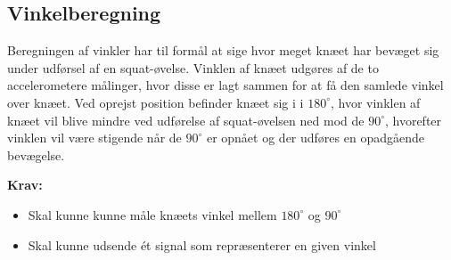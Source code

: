 \subsection{Vinkelberegning}
Beregningen af vinkler har til formål at sige hvor meget knæet har bevæget sig under udførsel af en squat-øvelse. Vinklen af knæet udgøres af de to accelerometere målinger, hvor disse er lagt sammen for at få den samlede vinkel over knæet.
Ved oprejst position befinder knæet sig i i $180^{\circ}$, hvor vinklen af knæet vil blive mindre ved udførelse af squat-øvelsen ned mod de $90^{\circ}$, hvorefter vinklen vil være stigende når de $90^{\circ}$ er opnået og der udføres en opadgående bevægelse. 

\textbf{Krav:}
\begin{itemize}
\item Skal kunne kunne måle knæets vinkel mellem $180^{\circ}$ og $90^{\circ}$
\item Skal kunne udsende ét signal som repræsenterer en given vinkel
\end{itemize}